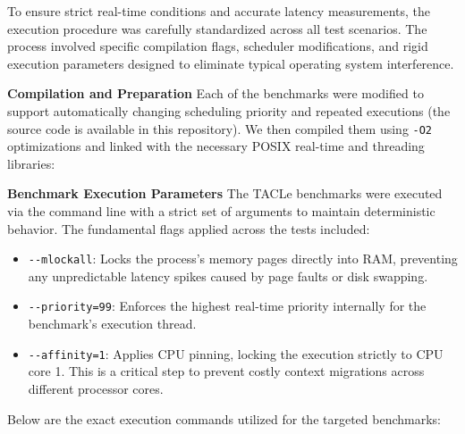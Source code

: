 To ensure strict real-time conditions and accurate latency measurements,
the execution procedure was carefully standardized across all test
scenarios. The process involved specific compilation flags, scheduler
modifications, and rigid execution parameters designed to eliminate
typical operating system interference.

\textbf{Compilation and Preparation} Each of the benchmarks were
modified to support automatically changing scheduling priority and
repeated executions (the source code is available in this repository).
We then compiled them using \texttt{-O2} optimizations and linked with
the necessary POSIX real-time and threading libraries:

\begin{Shaded}
\begin{Highlighting}[]
\end{Highlighting}
\end{Shaded}

\textbf{Benchmark Execution Parameters} The TACLe benchmarks were
executed via the command line with a strict set of arguments to maintain
deterministic behavior. The fundamental flags applied across the tests
included:

\begin{itemize}
\item
  \texttt{-\/-mlockall}: Locks the process's memory pages directly into
  RAM, preventing any unpredictable latency spikes caused by page faults
  or disk swapping.
\item
  \texttt{-\/-priority=99}: Enforces the highest real-time priority
  internally for the benchmark's execution thread.
\item
  \texttt{-\/-affinity=1}: Applies CPU pinning, locking the execution
  strictly to CPU core 1. This is a critical step to prevent costly
  context migrations across different processor cores.
\end{itemize}

Below are the exact execution commands utilized for the targeted
benchmarks:

\begin{Shaded}
\begin{Highlighting}[]
\end{Highlighting}
\end{Shaded}

